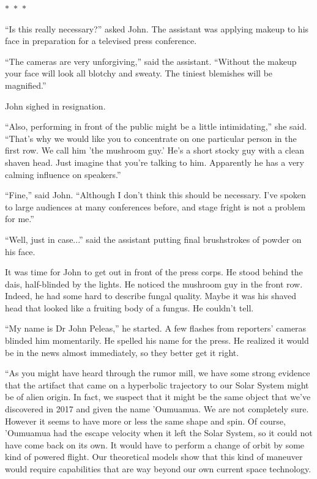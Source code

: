 \documentclass{memoir}
\newcommand{\starbreak}{%
\begin{center}
  $\ast$~$\ast$~$\ast$
\end{center}
}
\begin{document}
\starbreak

``Is this really necessary?'' asked John. The assistant was applying makeup to his face in preparation for a televised press conference. 

``The cameras are very unforgiving,'' said the assistant. ``Without the makeup your face will look all blotchy and sweaty. The tiniest blemishes will be magnified.''

John sighed in resignation.

``Also, performing in front of the public might be a little intimidating,'' she said. ``That's why we would like you to concentrate on one particular person in the first row. We call him 'the mushroom guy.' He's a short stocky guy with a clean shaven head. Just imagine that you're talking to him. Apparently he has a very calming influence on speakers.''

``Fine,'' said John. ``Although I don't think this should be necessary. I've spoken to large audiences at many conferences before, and stage fright is not a problem for me.''

``Well, just in case...'' said the assistant putting final brushstrokes of powder on his face.

It was time for John to get out in front of the press corps. He stood behind the dais, half-blinded by the lights. He noticed the mushroom guy in the front row. Indeed, he had some hard to describe fungal quality. Maybe it was his shaved head that looked like a fruiting body of a fungus. He couldn't tell.

``My name is Dr John Peleas,'' he started. A few flashes from reporters' cameras blinded him momentarily. He spelled his name for the press. He realized it would be in the news almost immediately, so they better get it right.

``As you might have heard through the rumor mill, we have some strong evidence that the artifact that came on a hyperbolic trajectory to our Solar System might be of alien origin. In fact, we suspect that it might be the same object that we've discovered in 2017 and given the name 'Oumuamua. We are not completely sure. However it seems to have more or less the same shape and spin. Of course, 'Oumuamua had the escape velocity when it left the Solar System, so it could not have come back on its own. It would have to perform a change of orbit by some kind of powered flight. Our theoretical models show that this kind of maneuver would require capabilities that are way beyond our own current space technology.
\end{document}
